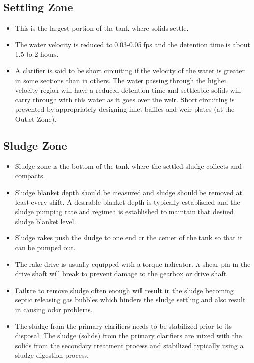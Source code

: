 \subsection{Settling Zone}
			\begin{itemize}
				\item This is the largest portion of the tank where 					solids settle.
				\item The water velocity is reduced to 0.03-0.05 fps 					and the detention time is about 1.5 to 2 hours. 
				\item A clarifier is said to be short circuiting if 					the velocity of the water is greater in some sections 					than in others. The water passing through the higher 					velocity region will have a reduced detention time and 				settleable solids will carry through with this water 					as it goes over the weir.  Short circuiting is 							prevented by appropriately designing inlet baffles and weir plates (at the Outlet Zone).
			\end{itemize}

\subsection{Sludge Zone}
			\begin{itemize} 
				\item Sludge zone is the bottom of the tank where the 					settled sludge collects and compacts.
				\item Sludge blanket depth should be measured and 						sludge should be removed at least every shift. A 						desirable blanket depth is typically established and 					the sludge pumping rate and regimen is established to 					maintain that desired sludge blanket level.
				\item Sludge rakes push the sludge to one end or the 					center of the tank so that it can be pumped out. 
				\item The rake drive is usually equipped with a torque 				indicator. A shear pin in the drive shaft will break 					to prevent damage to the gearbox or drive shaft. 
				\item Failure to remove sludge often enough will 						result in the sludge becoming septic releasing gas 						bubbles which hinders the sludge settling and also 						result in causing odor problems.
				\item The sludge from the primary clarifiers needs to 					be stabilized prior to its disposal.  The sludge 						(solids) from the primary clarifiers are mixed with 					the solids from the secondary treatment process and 					stabilized typically using a sludge digestion process. 
			\end{itemize}
